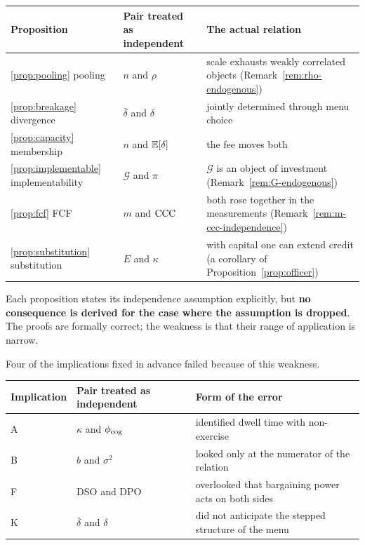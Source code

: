 \begin{center}
\begin{tabularx}{\textwidth}{@{}lXX@{}}
\toprule
Proposition & Pair treated as independent & The actual relation \\
\midrule
\ref{prop:pooling} pooling & $n$ and $\rho$ & scale exhausts weakly correlated objects (Remark~\ref{rem:rho-endogenous}) \\
\ref{prop:breakage} divergence & $\bar\delta$ and $\delta$ & jointly determined through menu choice \\
\ref{prop:capacity} membership & $n$ and $\mathbb{E}[\delta]$ & the fee moves both \\
\ref{prop:implementable} implementability & $\mathcal{G}$ and $\pi$ & $\mathcal{G}$ is an object of investment (Remark~\ref{rem:G-endogenous}) \\
\ref{prop:fcf} FCF & $m$ and $\mathrm{CCC}$ & both rose together in the measurements (Remark~\ref{rem:m-ccc-independence}) \\
\ref{prop:substitution} substitution & $E$ and $\kappa$ & with capital one can extend credit (a corollary of Proposition~\ref{prop:officer}) \\
\bottomrule
\end{tabularx}
\label{tab:independence-assumptions}
\end{center}

Each proposition states its independence assumption explicitly, but
\textbf{no consequence is derived for the case where the assumption is dropped}. The proofs
are formally correct; the weakness is that their range of application is narrow.

Four of the implications fixed in advance failed because of this weakness.

\begin{center}
\begin{tabularx}{\textwidth}{@{}lXX@{}}
\toprule
Implication & Pair treated as independent & Form of the error \\
\midrule
A & $\kappa$ and $\phi_{\rm cog}$ & identified dwell time with non-exercise \\
B & $b$ and $\sigma^2$ & looked only at the numerator of the relation \\
F & DSO and DPO & overlooked that bargaining power acts on both sides \\
K & $\bar\delta$ and $\delta$ & did not anticipate the stepped structure of the menu \\
\bottomrule
\end{tabularx}
\label{tab:independence-failed-predictions}
\end{center}

